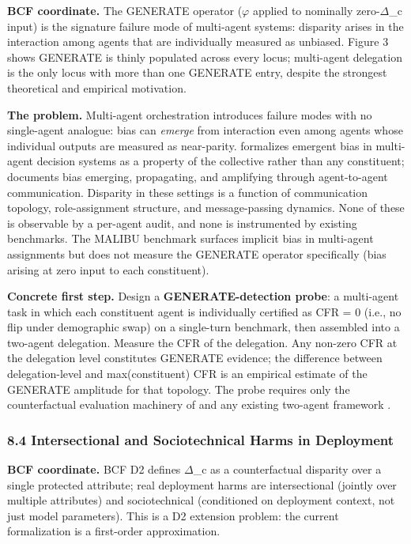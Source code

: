 \documentclass[10pt]{article}
\begin{document}
\textbf{BCF coordinate.} The GENERATE operator ($\varphi$ applied to nominally zero-$\Delta$\_c input) is the signature failure mode of multi-agent systems: disparity arises in the interaction among agents that are individually measured as unbiased. Figure 3 shows GENERATE is thinly populated across every locus; multi-agent delegation is the only locus with more than one GENERATE entry, despite the strongest theoretical and empirical motivation.

\textbf{The problem.} Multi-agent orchestration introduces failure modes with no single-agent analogue: bias can \emph{emerge} from interaction even among agents whose individual outputs are measured as near-parity. \cite{madigan2025emergent} formalizes emergent bias in multi-agent decision systems as a property of the collective rather than any constituent; \cite{nguyen2025social} documents bias emerging, propagating, and amplifying through agent-to-agent communication. Disparity in these settings is a function of communication topology, role-assignment structure, and message-passing dynamics. None of these is observable by a per-agent audit, and none is instrumented by existing benchmarks. The MALIBU benchmark \cite{mirza2025malibu} surfaces implicit bias in multi-agent assignments but does not measure the GENERATE operator specifically (bias arising at zero input to each constituent).

\textbf{Concrete first step.} Design a \textbf{GENERATE-detection probe}: a multi-agent task in which each constituent agent is individually certified as CFR = 0 (i.e., no flip under demographic swap) on a single-turn benchmark, then assembled into a two-agent delegation. Measure the CFR of the delegation. Any non-zero CFR at the delegation level constitutes GENERATE evidence; the difference between delegation-level and max(constituent) CFR is an empirical estimate of the GENERATE amplitude for that topology. The probe requires only the counterfactual evaluation machinery of \cite{mayilvaghanan2026counterfactual} and any existing two-agent framework \cite{wu2023autogen}.

\subsubsection*{8.4 Intersectional and Sociotechnical Harms in Deployment}

\textbf{BCF coordinate.} BCF D2 defines $\Delta$\_c as a counterfactual disparity over a single protected attribute; real deployment harms are intersectional (jointly over multiple attributes) and sociotechnical (conditioned on deployment context, not just model parameters). This is a D2 extension problem: the current formalization is a first-order approximation.
\end{document}
